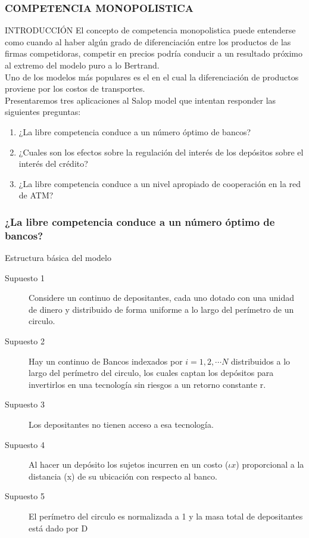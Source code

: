 
\begin{frame}
    \frametitle{{\normalsize COMPETENCIA MONOPOLISTICA} {}}
    \setcounter{equation}{0}
    \begin{block} {INTRODUCCIÓN}
     El concepto de competencia monopolistica puede entenderse como cuando al haber algún grado de diferenciación entre los productos de las firmas competidoras, competir en precios podría conducir a un resultado próximo al extremo del modelo puro a lo Bertrand.\\
     Uno de los modelos más populares es el \cite{Salop1979} en el cual la diferenciación de productos proviene por los costos de transportes.\\
     Presentaremos tres aplicaciones al Salop model que intentan responder las siguientes preguntas:
     \begin{enumerate}
         \item ¿La libre competencia conduce a un número óptimo de bancos?
         \item ¿Cuales son los efectos sobre la regulación del interés de los depósitos sobre el interés del crédito?
         \item ¿La libre competencia conduce a un nivel apropiado de cooperación en la red de ATM?
     \end{enumerate}
         
    \end{block}	
    
\end{frame}


\begin{frame}
    \frametitle{{\normalsize ¿La libre competencia conduce a un número óptimo de bancos?} {}}
    
   \begin{block} {Estructura básica del modelo}
       \begin{description}
           \item[Supuesto 1]  Considere un continuo de depositantes, cada uno dotado con una unidad de dinero y distribuido de forma uniforme a lo largo del perímetro de un  circulo.
           \item[Supuesto 2] Hay un continuo de Bancos indexados por $i=1,2,\cdots N$ distribuidos a lo largo del perímetro del circulo, los cuales captan los depósitos para invertirlos en una tecnología sin riesgos a un retorno constante r.
           \item[Supuesto 3] Los depositantes no tienen acceso a esa tecnología.
            \item[Supuesto 4] Al hacer un depósito los sujetos incurren en un costo ($\iota x$) proporcional a la distancia (x) de su ubicación con respecto al banco. 
             \item[Supuesto 5] El perímetro  del circulo es normalizada a 1 y la masa total de depositantes está dado por D
       \end{description}
       
   \end{block}	
    
\end{frame}


